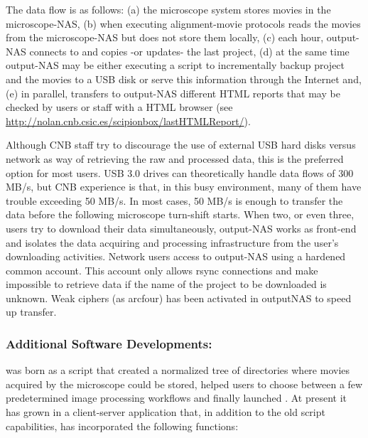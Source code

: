 The data flow is as follows: (a) the microscope system stores movies in the microscope-NAS, (b) when executing alignment-movie protocols \scipionbox reads the movies from the microscope-NAS but does not store them locally, (c) each hour, output-NAS connects to \scipionbox and copies -or updates- the last \scipion project, (d) at the same time output-NAS may be either executing a script to incrementally backup \scipion project and the movies to a USB disk or serve this information through the Internet and, (e) in parallel, \scipionbox transfers to  output-NAS different HTML reports that may be checked by users or staff with a HTML browser (see \url{http://nolan.cnb.csic.es/scipionbox/lastHTMLReport/}).

Although CNB staff try to discourage the use of external USB hard disks versus network as way of retrieving the raw and processed data, this is the preferred option for most users.
USB 3.0 drives can theoretically handle data flows of 300 MB/s, but CNB experience is that, in this busy environment, many of them  have trouble exceeding 50 MB/s. In most cases, 50 MB/s is enough to transfer the data before the following microscope  turn-shift starts. When two, or even three, users try to download their
data simultaneously, output-NAS works as front-end and isolates the data
acquiring and processing infrastructure from the user's downloading activities.
Network users access to output-NAS using a hardened common account. This account only allows rsync connections and make impossible to retrieve data if the name of the project to be downloaded is unknown. Weak ciphers (as arcfour) has been activated in outputNAS to speed up transfer.

\subsubsection{Additional Software Developments: \emadmin}

\emadmin was born as a script that created a normalized tree of directories  
where movies acquired by the microscope could be stored, helped users to choose between a few predetermined image processing workflows and finally launched \scipion. At present it has grown in a client-server application that, in addition to the old script capabilities, has incorporated the following functions:

